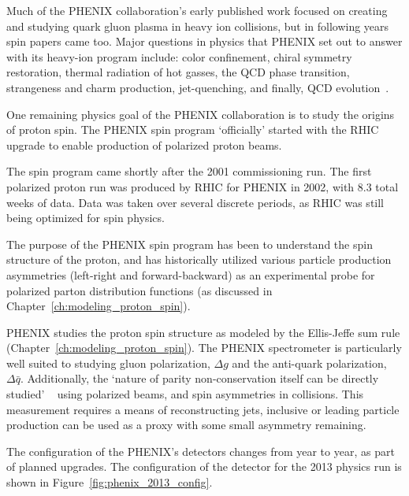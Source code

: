 Much of the PHENIX collaboration's early published work focused on creating and
studying quark gluon plasma in heavy ion collisions, but in following years spin
papers came too. Major questions in physics that PHENIX set out to answer with
its heavy-ion program include: color confinement, chiral symmetry restoration,
thermal radiation of hot gasses, the QCD phase transition, strangeness and charm
production, jet-quenching, and finally, QCD evolution~\cite{Nagamiya1994}.

One remaining physics goal of the PHENIX collaboration is to study the origins
of proton spin. The PHENIX spin program `officially' started with the RHIC
upgrade to enable production of polarized proton beams. 

The spin program came shortly after the 2001 commissioning run. The first
polarized proton run was produced by RHIC for PHENIX in 2002, with 8.3 total
weeks of data. Data was taken over several discrete periods, as RHIC was still
being optimized for spin physics.

The purpose of the PHENIX spin program has been to understand the spin structure
of the proton, and has historically utilized various particle production
asymmetries (left-right and forward-backward) as an experimental probe for
polarized parton distribution functions (as discussed in
Chapter~\ref{ch:modeling_proton_spin}). 

PHENIX studies the proton spin structure as modeled by the Ellis-Jeffe sum rule
(Chapter~\ref{ch:modeling_proton_spin}). The PHENIX spectrometer is particularly
well suited to studying gluon polarization, $\Delta g$ and the anti-quark
polarization, $\Delta \bar{q}$. Additionally, the `nature of parity
non-conservation itself can be directly studied' ~\cite{PHENIXCollaboration1998}
using polarized beams, and spin asymmetries in collisions.  This measurement
requires a means of reconstructing jets, inclusive or leading particle
production can be used as a proxy with some small asymmetry remaining.

The configuration of the PHENIX's detectors changes from year to year, as part
of planned upgrades. The configuration of the detector for the 2013 physics run
is shown in Figure~\ref{fig:phenix_2013_config}.


